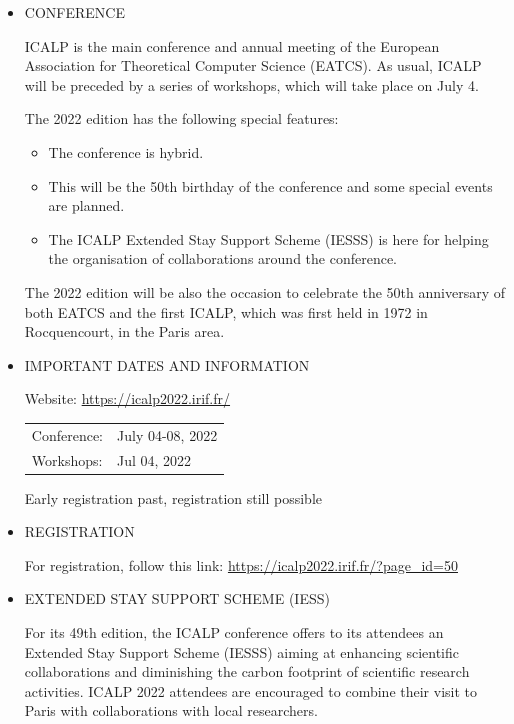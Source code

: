 \documentclass[prodmode,acmtecs]{acmsmall} %
\begin{document}
\begin{itemize}\item  CONFERENCE 
 
  ICALP is the main conference and annual meeting of the European Association for Theoretical Computer Science (EATCS). As usual, ICALP will be preceded by a series of workshops, which will take place on July 4.  
 
  The 2022 edition has the following special features: 
 
\begin{itemize}\item  The conference is hybrid.
\item  This will be the 50th birthday of the conference and some special events are planned.
\item  The ICALP Extended Stay Support Scheme (IESSS) is here for helping the organisation of collaborations around the conference.
\end{itemize} 
  The 2022 edition will be also the occasion to celebrate the 50th anniversary of both EATCS and the first ICALP, which was first held in 1972 in Rocquencourt, in the Paris area. 
 
\item  IMPORTANT DATES AND INFORMATION  
 
  Website: \href{https://icalp2022.irif.fr/}{https://icalp2022.irif.fr/}  
 
\begin{tabulary}{\linewidth}{LL}Conference:  & July 04-08, 2022 \\
Workshops:  & Jul 04, 2022 \\
\end{tabulary}
 
  Early registration past, registration still possible 
 
\item  REGISTRATION  
 
  For registration, follow this link: \href{https://icalp2022.irif.fr/?page_id=50}{https://icalp2022.irif.fr/?page\_id=50} 
 
\item  EXTENDED STAY SUPPORT SCHEME (IESS)  
 
  For its 49th edition, the ICALP conference offers to its attendees an Extended Stay Support Scheme (IESSS) aiming at enhancing scientific collaborations and diminishing the carbon footprint of scientific research activities. ICALP 2022 attendees are encouraged to combine their visit to Paris with collaborations with local researchers. 
 

\end{itemize}
\end{document}

